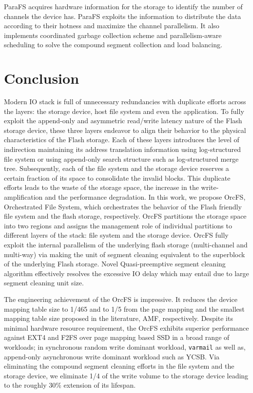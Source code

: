 \documentclass[pageno]{jpaper}
\begin{document}
ParaFS \cite{zhang2016parafs} acquires hardware information for the
storage to identify the number of channels the device has. ParaFS
exploits the information to distribute the data according to their
hotness and maximize the channel parallelism.  It also implements
coordinated garbage collection scheme and parallelism-aware scheduling
to solve the compound segment collection and load balancing.


\section{Conclusion}
\label{sec:conclusion}

Modern IO stack is full of unnecessary redundancies with duplicate
efforts across the layers: the storage device, host file system and
even the application.  To fully exploit the append-only and asymmetric
read/write latency nature of the Flash storage device, these three
layers endeavor to align their behavior to the physical
characteristics of the Flash storage. Each of these layers introduces
the level of indirection maintaining its address translation
information using log-structured file system or using append-only
search structure such as log-structured merge tree. Subsequently, each
of the file system and the storage device reserves a certain fraction
of its space to consolidate the invalid blocks.  This duplicate
efforts leads to the waste of the storage space, the increase in the
write-amplification and the performance degradation. In this work, we
propose OrcFS, Orchestrated File System, which orchestrates the
behavior of the Flash friendly file system and the flash storage,
respectively. OrcFS partitions the storage space into two regions and
assigns the management role of individual partitions to different
layers of the stack: file system and the storage device. OrcFS fully
exploit the internal parallelism of the underlying flash storage
(multi-channel and multi-way) via making the unit of segment cleaning
equivalent to the superblock of the underlying Flash storage. Novel
Quasi-preemptive segment cleaning algorithm effectively resolves the
excessive IO delay which may entail due to large segment cleaning unit
size.

The engineering achievement of the OrcFS is impressive.  It reduces the
device mapping table size to 1/465 and to 1/5 from the page mapping and
the smallest mapping table size proposed in the literature,
AMF, respectively.  Despite its minimal hardware resource
requirement, the OrcFS exhibits superior performance against EXT4 and
F2FS over page mapping based SSD in a broad range of workloads; in
synchronous random write dominant workload, \texttt{varmail} as well
as, append-only asynchronous write dominant workload such as YCSB.
Via eliminating the compound segment cleaning efforts in the
file system and the storage device, we eliminate 1/4 of the write
volume to the storage device leading to the roughly 30\% extension of
its lifespan.

%
%
%



\end{document}
